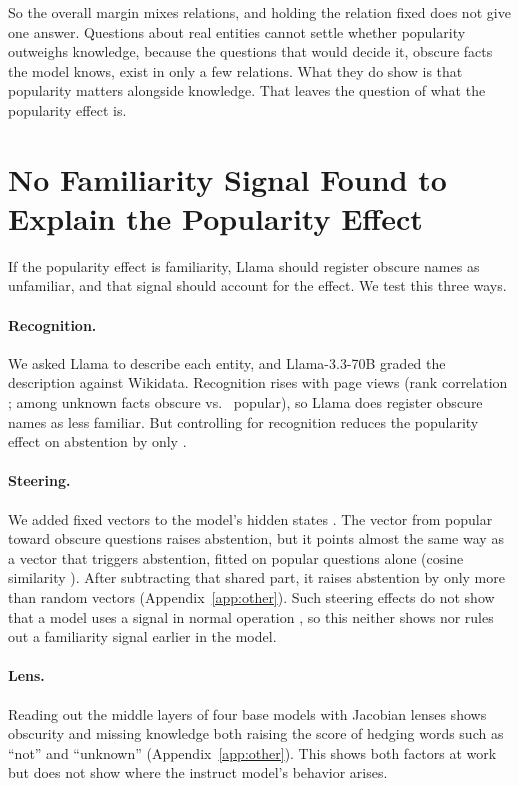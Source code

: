 \documentclass[11pt]{article}
\begin{document}
So the overall margin mixes relations, and holding the relation fixed does not give one answer. Questions about real entities cannot settle whether popularity outweighs knowledge, because the questions that would decide it, obscure facts the model knows, exist in only a few relations. What they do show is that popularity matters alongside knowledge. That leaves the question of what the popularity effect is.

\section{No Familiarity Signal Found to Explain the Popularity Effect}
\label{sec:mech}

If the popularity effect is familiarity, Llama should register obscure names as unfamiliar, and that signal should account for the effect. We test this three ways.

\paragraph{Recognition.} We asked Llama to describe each entity, and Llama-3.3-70B graded the description against Wikidata. Recognition rises with page views (rank correlation \ekRho; among unknown facts \mcObsUnkRec{} obscure vs.\ \mcPopUnkRec{} popular), so Llama does register obscure names as less familiar. But controlling for recognition reduces the popularity effect on abstention by only \ekShrink.

\paragraph{Steering.} We added fixed vectors to the model's hidden states \citep{arditi2024refusal}. The vector from popular toward obscure questions raises abstention, but it points almost the same way as a vector that triggers abstention, fitted on popular questions alone (cosine similarity \gaCos). After subtracting that shared part, it raises abstention by only \gaPerp{} \gaPerpCI{} more than random vectors (Appendix~\ref{app:other}). Such steering effects do not show that a model uses a signal in normal operation \citep{che2026steering}, so this neither shows nor rules out a familiarity signal earlier in the model.

\paragraph{Lens.} Reading out the middle layers of four base models with Jacobian lenses \citep{gurnee2026workspace} shows obscurity and missing knowledge both raising the score of hedging words such as ``not'' and ``unknown'' (Appendix~\ref{app:other}). This shows both factors at work but does not show where the instruct model's behavior arises.
\end{document}
